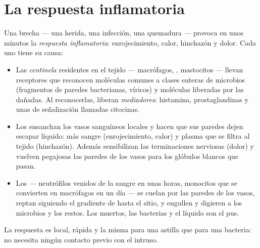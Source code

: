\section{La respuesta inflamatoria}

\begin{proposition}\label{prop:g12:innate-immunity:inflammation}
Una brecha --- una herida, una infección, una quemadura --- provoca en
unos minutos la \emph{respuesta inflamatoria}:
enrojecimiento, calor, hinchazón y dolor. Cada uno tiene su causa:
\begin{itemize}
  \item Las \emph{ centinela} residentes en el tejido ---
        macrófagos, , mastocitos --- llevan
        receptores que reconocen moléculas comunes a clases enteras de
        microbios (fragmentos de paredes bacterianas, 
        víricos) y moléculas liberadas por las  dañadas. Al
        reconocerlas, liberan
        \emph{mediadores}: histamina,
        prostaglandinas y unas  de señalización llamadas
        citocinas.
  \item Los  ensanchan los vasos sanguíneos locales y hacen
        que sus paredes dejen escapar líquido: más sangre
        (enrojecimiento, calor) y plasma que se filtra al tejido
        (hinchazón). Además sensibilizan las terminaciones nerviosas
        (dolor) y vuelven pegajosas las paredes de los vasos para los
        glóbulos blancos que pasan.
  \item Los \emph{} --- neutrófilos venidos de la sangre en
        unas horas, monocitos que se convierten en macrófagos en un día
        --- se cuelan por las paredes de los vasos, reptan siguiendo el
        gradiente de  hasta el sitio, y engullen y digieren a
        los microbios y los restos. Los  muertos, las
        bacterias y el líquido son el pus.
\end{itemize}
La respuesta es local, rápida y la misma para una astilla que para una
bacteria: no necesita ningún contacto previo con el intruso.
\end{proposition}
